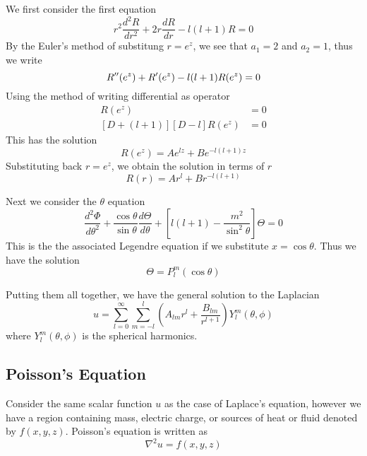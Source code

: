 \documentclass[../main.tex]{subfiles}
\begin{document}
We first consider the first equation
\begin{equation*}
    r^2\frac{d^2R}{dr^2}+2r\frac{dR}{dr}-l(l+1)R=0
\end{equation*}
By the Euler's method of substitung $r=e^z$, we see that $a_1=2$ and $a_2=1$, thus we write
\begin{equation*}
    R''(e^z)+R'(e^z)-l(l+1)R(e^z)=0\\
\end{equation*}
Using the method of writing differential as operator
\begin{align*}
    [D^2+D-l(l+1)] R(e^z)&=0\\
    [D+(l+1)][D-l]R(e^z)&=0
\end{align*}
This has the solution
\begin{equation*}
    R(e^z)= Ae^{lz}+Be^{-l(l+1)z}
\end{equation*}
Substituting back $r=e^z$, we obtain the solution in terms of $r$
\begin{equation*}
    R(r)= Ar^{l}+Br^{-l(l+1)}
\end{equation*}

Next we consider the $\theta$ equation 
\begin{equation*}
    \frac{d^2\Phi}{d\theta^2} +\frac{\cos \theta}{\sin\theta}\frac{d\Theta}{d\theta} +\left[l(l+1)-\frac{m^2}{\sin^2\theta} \right]\Theta =0
\end{equation*}
This is the the associated Legendre equation if we substitute $x=\cos \theta$. Thus we have the solution
\begin{equation*}
    \Theta=P_l^m(\cos\theta)
\end{equation*}

Putting them all together, we have the general solution to the Laplacian
\begin{equation*}
    u=\sum_{l=0}^{\infty}\sum_{m=-l }^{l}\left(A_{lm}r^l +\frac{B_{lm}}{r^{l+1}}\right)Y_l^m(\theta,\phi)
\end{equation*}
where $Y_l^m(\theta,\phi)$ is the spherical harmonics.


\subsection*{Poisson’s Equation}
Consider the same scalar function $u$ as the case of Laplace's equation, however we have a region containing mass, electric charge, or sources of heat or fluid denoted by $f(x,y,z)$. Poisson's equation is written as 
\begin{equation*}
    \nabla^2 u=f(x,y,z)
\end{equation*}
\end{document}
